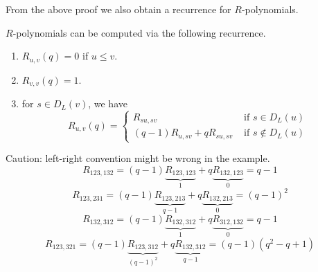 From the above proof we also obtain a recurrence for $R$-polynomials.
\begin{corollary}\label{thm:R-recurrence}$R$-polynomials can be computed via the following recurrence.
	\begin{enumerate}
		\item $R_{u,v}(q)=0$ if $u\leq v$.
		\item $R_{v,v}(q)=1$.
		\item for $s\in D_L(v)$, we have
		\[R_{u,v}(q)=\begin{cases}
R_{su,sv}&\text{ if }s\in D_L(u)\\
(q-1)R_{u,sv}+qR_{su,sv}&\text{ if }s\notin D_L(u)	
\end{cases}
\]
\end{enumerate}
\end{corollary}
\begin{example}{\color{red}Caution: left-right convention might be wrong in the example.}
	\[R_{123,132}=(q-1)\underbrace{R_{123,123}}_{1}+q\underbrace{R_{132,123}}_{0}=q-1\]
	\[R_{123,231}=(q-1)\underbrace{R_{123,213}}_{q-1}+q\underbrace{R_{132,213}}_{0}=(q-1)^2\]
	\[R_{132,312}=(q-1)\underbrace{R_{132,312}}_{1}+q\underbrace{R_{312,132}}_{0}=q-1\]
	\[R_{123,321}=(q-1)\underbrace{R_{123,312}}_{(q-1)^2}+q\underbrace{R_{132,312}}_{q-1}=(q-1)(q^2-q
	+1)\]
		\end{example}

	



